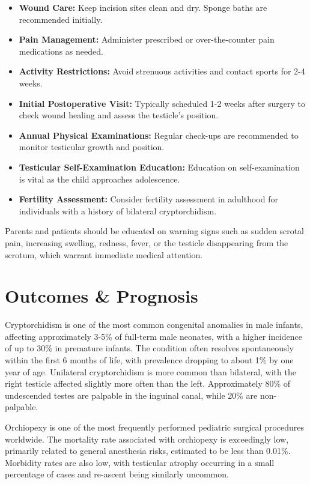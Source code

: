 \begin{itemize}
  \item \textbf{Wound Care:} Keep incision sites clean and dry. Sponge baths are recommended initially.
  
  \item \textbf{Pain Management:} Administer prescribed or over-the-counter pain medications as needed.
  
  \item \textbf{Activity Restrictions:} Avoid strenuous activities and contact sports for 2-4 weeks.
  
  \item \textbf{Initial Postoperative Visit:} Typically scheduled 1-2 weeks after surgery to check wound healing and assess the testicle's position.
  
  \item \textbf{Annual Physical Examinations:} Regular check-ups are recommended to monitor testicular growth and position.
  
  \item \textbf{Testicular Self-Examination Education:} Education on self-examination is vital as the child approaches adolescence.
  
  \item \textbf{Fertility Assessment:} Consider fertility assessment in adulthood for individuals with a history of bilateral cryptorchidism.
\end{itemize}

Parents and patients should be educated on warning signs such as sudden scrotal pain, increasing swelling, redness, fever, or the testicle disappearing from the scrotum, which warrant immediate medical attention.

\section*{Outcomes \& Prognosis}
Cryptorchidism is one of the most common congenital anomalies in male infants, affecting approximately 3-5\% of full-term male neonates, with a higher incidence of up to 30\% in premature infants. The condition often resolves spontaneously within the first 6 months of life, with prevalence dropping to about 1\% by one year of age. Unilateral cryptorchidism is more common than bilateral, with the right testicle affected slightly more often than the left. Approximately 80\% of undescended testes are palpable in the inguinal canal, while 20\% are non-palpable. 

Orchiopexy is one of the most frequently performed pediatric surgical procedures worldwide. The mortality rate associated with orchiopexy is exceedingly low, primarily related to general anesthesia risks, estimated to be less than 0.01\%. Morbidity rates are also low, with testicular atrophy occurring in a small percentage of cases and re-ascent being similarly uncommon.

